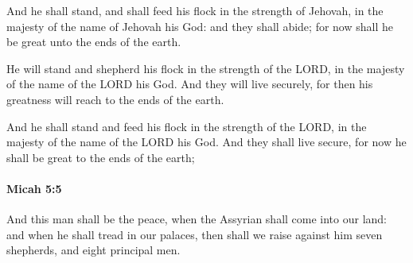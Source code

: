 			\begin{versebox}
					\item[BHS] 
					\item[LXX] 
					\item[ASV] And he shall stand, and shall feed his flock in the strength of Jehovah, in the majesty of the name of Jehovah his God: and they shall abide; for now shall he be great unto the ends of the earth.
					\item[NIV] He will stand and shepherd his flock in the strength of the LORD, in the majesty of the name of the LORD his God. And they will live securely, for then his greatness will reach to the ends of the earth.
					\item[NRSV] And he shall stand and feed his flock in the strength of the LORD, in the majesty of the name of the LORD his God. And they shall live secure, for now he shall be great to the ends of the earth;
			\end{versebox}

		\paragraph{Micah 5:5} %
			\label{MICAH-5-5}

			And this man shall be the peace, when the Assyrian shall come into our land: and when he shall tread in our palaces, then shall we raise against him seven shepherds, and eight principal men.

